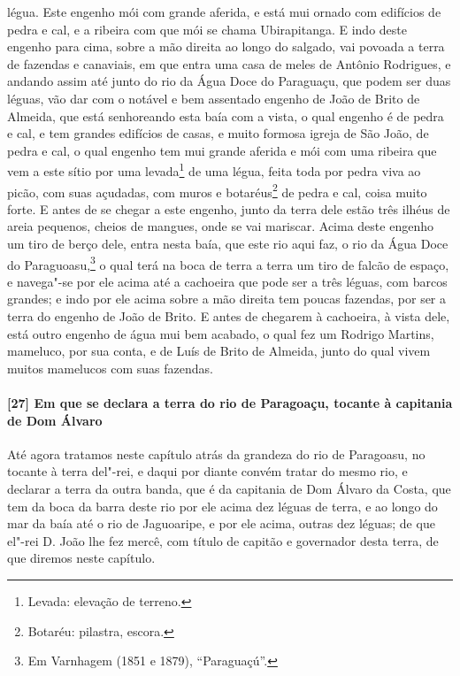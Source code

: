 légua. Este engenho mói com grande aferida, e está mui ornado com edifícios de pedra e
cal, e a ribeira com que mói se chama Ubirapitanga. E indo deste engenho para cima, sobre
a mão direita ao longo do salgado, vai povoada a terra de fazendas e canaviais, em que
entra uma casa de meles de Antônio Rodrigues, e andando assim até junto do rio da Água
Doce do Paraguaçu, que podem ser duas léguas, vão dar com o notável e bem assentado
engenho de João de Brito de Almeida, que está senhoreando esta baía com a vista, o qual
engenho é de pedra e cal, e tem grandes edifícios de casas, e muito formosa igreja de São
João, de pedra e cal, o qual engenho tem mui grande aferida e mói com uma ribeira que vem
a este sítio por uma levada\footnote{ Levada: elevação de terreno.} de uma légua, feita
toda por pedra viva ao picão, com suas açudadas, com muros e botaréus\footnote{ Botaréu:
pilastra, escora.} de pedra e cal, coisa muito forte. E antes de se chegar a este engenho,
junto da terra dele estão três ilhéus de areia pequenos, cheios de mangues, onde se vai
mariscar. Acima deste engenho um tiro de berço dele, entra nesta baía, que este rio aqui
faz, o rio da Água Doce do Paraguoasu,\footnote{ Em Varnhagem (1851 e 1879),
``Paraguaçú''.} o qual terá na boca de terra a terra um tiro de falcão de espaço, e
navega"-se por ele acima até a cachoeira que pode ser a três léguas, com barcos grandes; e
indo por ele acima sobre a mão direita tem poucas fazendas, por ser a terra do engenho de
João de Brito. E antes de chegarem à cachoeira, à vista dele, está outro engenho de água
mui bem acabado, o qual fez um Rodrigo Martins, mameluco, por sua conta, e de Luís de
Brito de Almeida, junto do qual vivem muitos mamelucos com suas fazendas.

\paragraph{[27] Em que se declara a terra do rio de Paragoaçu, tocante à capitania de Dom
Álvaro}\quad
Até agora tratamos neste capítulo atrás da grandeza do rio de Paragoasu, no tocante à
terra del"-rei, e daqui por diante convém tratar do mesmo rio, e declarar a terra da outra
banda, que é da capitania de Dom Álvaro da Costa, que tem da boca da barra deste rio por
ele acima dez léguas de terra, e ao longo do mar da baía até o rio de Jaguoaripe, e por
ele acima, outras dez léguas; de que el"-rei D. João lhe fez mercê, com título de capitão e
governador desta terra, de que diremos neste capítulo.

